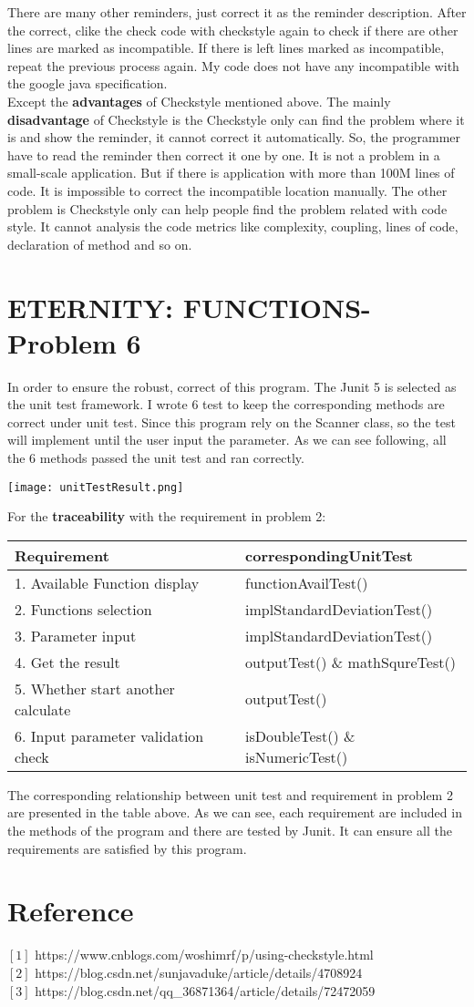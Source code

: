 \documentclass[11pt]{report}
\begin{document}
There are many other reminders, just correct it as the reminder description. After the correct, clike the check code with checkstyle again to check if there are other lines are marked as incompatible. If there is left lines marked as incompatible, repeat the previous process again. My code does not have any incompatible with the google java specification.\\
Except the \textbf{advantages} of Checkstyle mentioned above. The mainly \textbf{disadvantage} of Checkstyle is the Checkstyle only can find the problem where it is and show the reminder, it cannot correct it automatically. So, the programmer have to read the reminder then correct it one by one. It is not a problem in a small-scale application. But if there is application with more than 100M lines of code. It is impossible  to correct the incompatible location manually. The other problem is Checkstyle only can help people find the problem related with code style. It cannot analysis the code metrics like complexity, coupling, lines of code, declaration of method and so on.
\section*{ETERNITY: FUNCTIONS-Problem 6}
In order to ensure the robust, correct of this program. The Junit 5 is selected as the unit test framework. I wrote 6 test to keep the corresponding methods are correct under unit test. Since this program rely on the Scanner class, so the test will implement until the user input the parameter. As we can see following, all the 6 methods passed the unit test and ran correctly.
\begin{center}
    \texttt{[image: unitTestResult.png]}
\end{center}
For the \textbf{traceability} with the requirement in problem 2:
\begin{center}
    \begin{tabular}{|l|l|}
    \hline
    Requirement&correspondingUnitTest\\
    \hline
    1. Available Function display & functionAvailTest()\\
    \hline
    2. Functions selection & implStandardDeviationTest()\\
    \hline
    3. Parameter input & implStandardDeviationTest()\\
    \hline
    4. Get the result & outputTest() \& mathSqureTest()\\
    \hline
    5. Whether start another calculate & outputTest()\\
    \hline
    6. Input parameter validation check & isDoubleTest() \& isNumericTest()\\
    \hline
    \end{tabular}
\end{center}
 The corresponding relationship between unit test and requirement in problem 2 are presented in the table above. As we can see, each requirement are included in the methods of the program and there are tested by Junit. It can ensure all the requirements are satisfied by this program.
 \section*{Reference}
 $\left[1\right]$ https://www.cnblogs.com/woshimrf/p/using-checkstyle.html\\
 $\left[2\right]$ https://blog.csdn.net/sunjavaduke/article/details/4708924\\
 $\left[3\right]$ https://blog.csdn.net/qq\_36871364/article/details/72472059
\end{document}
